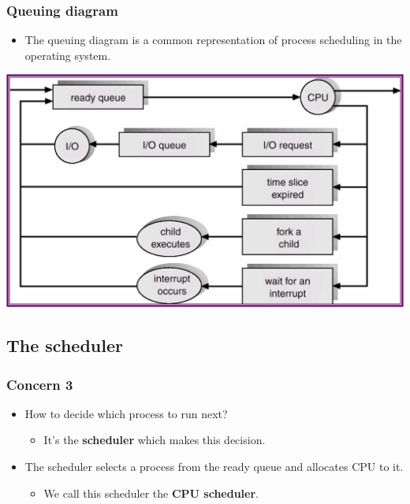 \documentclass[CJKutf8,xcolor=pdftex,dvipsnames,table]{beamer}
\begin{document}
\begin{CJK*}{UTF8}{song}
  \begin{frame}
  \frametitle{Queuing diagram} \pause
  \begin{itemize}
  \item{The queuing diagram is a common representation of process scheduling in the operating system.} \pause
  \end{itemize}
  \begin{center}
  \includegraphics[scale=0.4]{v6f4-5}
  \end{center}
  \end{frame}

  \subsection{The scheduler}
  
  \begin{frame}
  \frametitle{Concern 3} \pause
  \begin{itemize}
  \item{How to decide which process to run next?} \pause
    \begin{itemize}
    \item{It's the \textbf{scheduler} which makes this decision.} \pause
    \end{itemize}
  \item{The scheduler selects a process from the ready queue and allocates CPU to it.} \pause
    \begin{itemize}
    \item{We call this scheduler the \textbf{CPU scheduler}.}
    \end{itemize}
  \end{itemize}
  \end{frame}

\iffalse


\end{CJK*}
\end{document}
